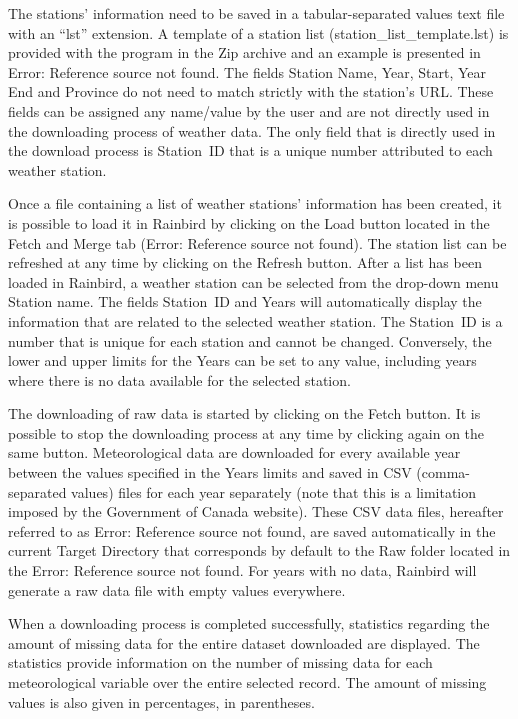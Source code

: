 \documentclass[12pt, letterpaper, fleqn]{report}
\begin{document}
The stations' information need to be saved in a tabular-separated values text file with an “lst” extension. A template of a station list (station\_list\_template.lst) is provided with the program in the Zip archive and an example is presented in Error: Reference source not found. The fields Station Name, Year, Start, Year End and Province do not need to match strictly with the station's URL. These fields can be assigned any name/value by the user and are not directly used in the downloading process of weather data. The only field that is directly used in the download process is Station ID that is a unique number attributed to each weather station.

Once a file containing a list of weather stations' information has been created, it is possible to load it in Rainbird by clicking on the  Load button located in the Fetch and Merge tab (Error: Reference source not found). The station list can be refreshed at any time by clicking on the  Refresh button. 
After a list has been loaded in Rainbird, a weather station can be selected from the drop-down menu Station name. The fields Station ID and Years will automatically display the information that are related to the selected weather station. The Station ID is a number that is unique for each station and cannot be changed. Conversely, the lower and upper limits for the Years can be set to any value, including years where there is no data available for the selected station. 

The downloading of raw data is started by clicking on the  Fetch button. It is possible to stop the downloading process at any time by clicking again on the same button. Meteorological data are downloaded for every available year between the values specified in the Years limits and saved in CSV (comma-separated values) files for each year separately (note that this is a limitation imposed by the Government of Canada website). These CSV data files, hereafter referred to as Error: Reference source not found, are saved automatically in the current Target Directory that corresponds by default to the Raw folder located in the Error: Reference source not found. For years with no data, Rainbird will generate a raw data file with empty values everywhere.

When a downloading process is completed successfully, statistics regarding the amount of missing data for the entire dataset downloaded are displayed. The statistics provide information on the number of missing data for each meteorological variable over the entire selected record. The amount of missing values is also given in percentages, in parentheses.
\end{document}
